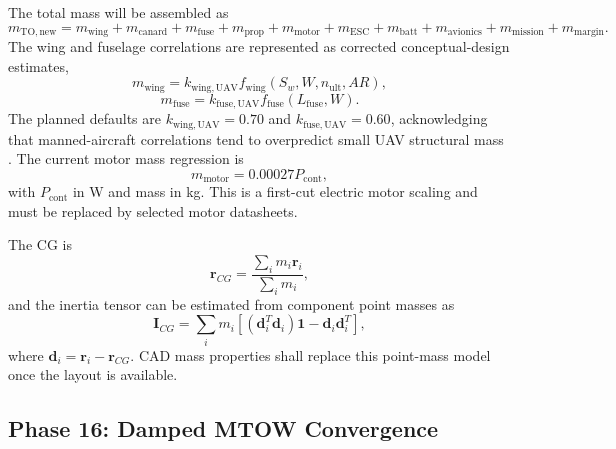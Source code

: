 The total mass will be assembled as
\begin{equation}
    m_{\mathrm{TO,new}} =
    m_{\mathrm{wing}}
    +m_{\mathrm{canard}}
    +m_{\mathrm{fuse}}
    +m_{\mathrm{prop}}
    +m_{\mathrm{motor}}
    +m_{\mathrm{ESC}}
    +m_{\mathrm{batt}}
    +m_{\mathrm{avionics}}
    +m_{\mathrm{mission}}
    +m_{\mathrm{margin}} .
    \label{eq:ppa_mass_total}
\end{equation}
The wing and fuselage correlations are represented as corrected conceptual-design estimates,
\begin{equation}
    m_{\mathrm{wing}} =
    k_{\mathrm{wing,UAV}} f_{\mathrm{wing}}(S_w,W,n_{\mathrm{ult}},AR),
    \label{eq:ppa_wing_mass}
\end{equation}
\begin{equation}
    m_{\mathrm{fuse}} =
    k_{\mathrm{fuse,UAV}} f_{\mathrm{fuse}}(L_{\mathrm{fuse}},W).
    \label{eq:ppa_fuse_mass}
\end{equation}
The planned defaults are \(k_{\mathrm{wing,UAV}}=0.70\) and \(k_{\mathrm{fuse,UAV}}=0.60\), acknowledging that manned-aircraft correlations tend to overpredict small UAV structural mass \cite{Raymer2018,Roskam1985PartVI,Gudmundsson2014}. The current motor mass regression is
\begin{equation}
    m_{\mathrm{motor}} =
    0.00027 P_{\mathrm{cont}},
    \label{eq:ppa_motor_mass}
\end{equation}
with \(P_{\mathrm{cont}}\) in W and mass in kg. This is a first-cut electric motor scaling and must be replaced by selected motor datasheets.

The CG is
\begin{equation}
    \mathbf{r}_{CG} =
    \frac{\sum_i m_i\mathbf{r}_i}{\sum_i m_i},
    \label{eq:ppa_cg}
\end{equation}
and the inertia tensor can be estimated from component point masses as
\begin{equation}
    \mathbf{I}_{CG}
    =
    \sum_i
    m_i
    \left[
    \left(\mathbf{d}_i^T\mathbf{d}_i\right)\mathbf{1}
    -
    \mathbf{d}_i\mathbf{d}_i^T
    \right],
    \label{eq:ppa_inertia}
\end{equation}
where \(\mathbf{d}_i=\mathbf{r}_i-\mathbf{r}_{CG}\). CAD mass properties shall replace this point-mass model once the layout is available.

\subsection{Phase 16: Damped MTOW Convergence}
\label{subsec:ppa_phase16}

